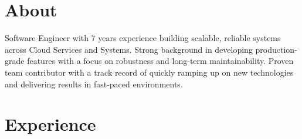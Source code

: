 \documentclass[11pt]{plushcv}
\begin{document}


\vspace{5pt}


\section{About}
\fontsize{11.5pt}{14pt}\selectfont %
Software Engineer with 7 years experience building scalable, reliable systems across Cloud Services and Systems. Strong background in developing production-grade features with a focus on robustness and long-term maintainability. Proven team contributor with a track record of quickly ramping up on new technologies and delivering results in fast-paced environments. 

\sectionsep

\section{Experience}
\fontsize{11.5pt}{13.5pt}\selectfont %
\end{document}
